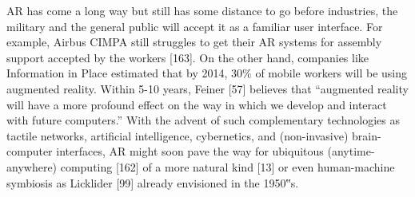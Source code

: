AR has come a long way but still has some distance to go
before industries, the military and the general public will
accept it as a familiar user interface. For example, Airbus
CIMPA still struggles to get their AR systems for assembly
support accepted by the workers [163]. On the other hand,
companies like Information in Place estimated that by 2014,
30\% of mobile workers will be using augmented reality.
Within 5-10 years, Feiner [57] believes that “augmented
reality will have a more profound effect on the way in which
we develop and interact with future computers.” With the
advent of such complementary technologies as tactile networks,
artificial intelligence, cybernetics, and (non-invasive)
brain-computer interfaces, AR might soon pave the way for
ubiquitous (anytime-anywhere) computing [162] of a more
natural kind [13] or even human-machine symbiosis as
Licklider [99] already envisioned in the 1950‟s.




